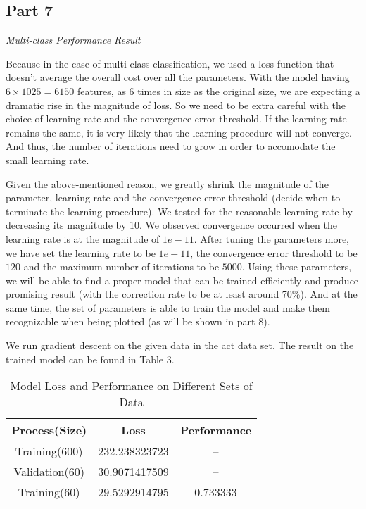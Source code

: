 \documentclass{article}
\begin{document}
\newpage
\begin{part7}

\maketitle

\newpage
\section{Part 7}
\noindent \textit{Multi-class Performance Result}

Because in the case of multi-class classification, we used a loss function that doesn't average the overall cost over all the parameters. With the model having $6 \times 1025 = 6150$ features, as 6 times in size as the original size, we are expecting a dramatic rise in the magnitude of loss. So we need to be extra careful with the choice of learning rate and the convergence error threshold. If the learning rate remains the same, it is very likely that the learning procedure will not converge. And thus, the number of iterations need to grow in order to accomodate the small learning rate.

\vspace{5mm}

Given the above-mentioned reason, we greatly shrink the magnitude of the parameter, learning rate and the convergence error threshold (decide when to terminate the learning procedure). We tested for the reasonable learning rate by decreasing its magnitude by 10. We observed convergence occurred when the learning rate is at the magnitude of $1e-11$. After tuning the parameters more, we have set the learning rate to be $1e-11$, the convergence error threshold to be $120$ and the maximum number of iterations to be $5000$. Using these parameters, we will be able to find a proper model that can be trained efficiently and produce promising result (with the correction rate to be at least around 70\%). And at the same time, the set of parameters is able to train the model and make them recognizable when being plotted (as will be shown in part 8).

\vspace{5mm}

We run gradient descent on the given data in the act data set. The result on the trained model can be found in Table 3.


\begin{table}[h!]
\centering
\begin{tabular}{||c c c||} 
 \hline
 Process(Size) & Loss & Performance\\ [0.5ex] 
 \hline\hline
 Training(600) & 232.238323723 & -- \\ 
 Validation(60) & 30.9071417509 & -- \\ 
 Training(60) & 29.5292914795 & 0.733333 \\[1ex] 
 \hline
\end{tabular}
\caption{Model Loss and Performance on Different Sets of Data}
\label{table:1}
\end{table}






\end{part7}
\end{document}
